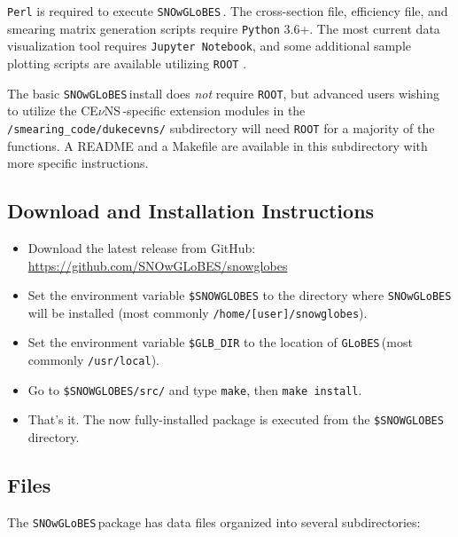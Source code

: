 \documentclass{article}
\newcommand{\cev}{CE$\nu$NS\,}
\newcommand{\snow}{\texttt{SNOwGLoBES}\,}
\newcommand{\glb}{\texttt{GLoBES}\,}
\begin{document}
\texttt{Perl} is required to execute \snow. The cross-section file, efficiency file, and smearing matrix generation scripts require \texttt{Python} 3.6+. The most current data visualization tool requires \texttt{Jupyter Notebook}, and some additional sample plotting scripts are available utilizing \texttt{ROOT} \cite{root}. 

The basic \snow install does \textit{not} require \texttt{ROOT}, but advanced users wishing to utilize the \cev-specific extension modules in the \texttt{/smearing\_code/dukecevns/} subdirectory will need \texttt{ROOT} for a majority of the functions. A README and a Makefile are available in this subdirectory with more specific instructions.

\subsection{Download and Installation Instructions}
\begin{itemize}
    \item Download the latest release from GitHub: \url{https://github.com/SNOwGLoBES/snowglobes}
    \item Set the environment variable \texttt{\$SNOWGLOBES} to the directory where \snow will be installed (most commonly \texttt{/home/[user]/snowglobes}).
    \item Set the environment variable \texttt{\$GLB\_DIR} to the location of \glb (most commonly \texttt{/usr/local}).
    \item Go to \texttt{\$SNOWGLOBES/src/} and type \texttt{make}, then \texttt{make install}.
    \item That's it. The now fully-installed package is executed from the \texttt{\$SNOWGLOBES} directory.
\end{itemize}

\subsection{Files}
The \snow package has data files organized into several subdirectories:
\end{document}
